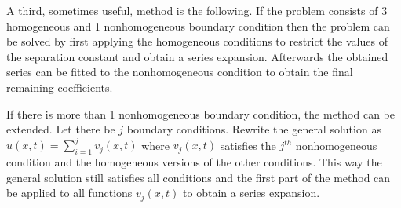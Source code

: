     \begin{method}
        A third, sometimes useful, method is the following. If the problem consists of 3 homogeneous and 1 nonhomogeneous boundary condition then the problem can be solved by first applying the homogeneous conditions to restrict the values of the separation constant and obtain a series expansion. Afterwards the obtained series can be fitted to the nonhomogeneous condition to obtain the final remaining coefficients.

        If there is more than 1 nonhomogeneous boundary condition, the method can be extended. Let there be $j$ boundary conditions. Rewrite the general solution as $u(x,t) = \sum_{i=1}^jv_j(x,t)$ where $v_j(x,t)$ satisfies the $j^{th}$ nonhomogeneous condition and the homogeneous versions of the other conditions. This way the general solution still satisfies all conditions and the first part of the method can be applied to all functions $v_j(x,t)$ to obtain a series expansion.
    \end{method}

